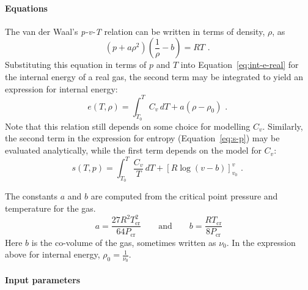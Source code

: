 \paragraph{Equations}
The van der Waal's \textit{p-v-T} relation can be written
in terms of density, $\rho$, as
\begin{equation}
  \left ( p + a\rho^2 \right ) \left ( \frac{1}{\rho} - b \right ) = RT \text{ . }
\end{equation}
Substituting this equation in terms of $p$ and $T$ into Equation~\ref{eq:int-e-real} for the internal energy of a real gas, the second term may be integrated to yield an expression for internal energy:
\begin{equation}
e(T, \rho) = \int_{T_0}^{T} C_v\,dT + a \left( \rho - \rho_0 \right) \text{ . }
\end{equation}
Note that this relation still depends on some choice for modelling $C_v$.
Similarly, the second term in the expression for entropy (Equation~\ref{eq:s-p})
may be evaluated analytically, while the first term depends on the model for $C_v$:
\begin{equation}
s(T,p) = \int_{T_0}^{T} \frac{C_v}{T}\,dT + \left [ R \log \left( v - b \right ) \right ]_{v_0}^{v} \text { . }
\end{equation}


The constants $a$ and $b$ are computed from the critical point pressure and
temperature for the gas.
\begin{equation}
   a = \frac{27 R^2 T^2_{\text{cr}}}{64 P_{\text{cr}}} \qquad \text{and} \qquad
   b = \frac{R T_{\text{cr}}}{8 P_{\text{cr}}}
\end{equation}
Here $b$ is the co-volume of the gas, sometimes written as $\nu_0$.
In the expression above for internal energy, $\rho_0 = \frac{1}{\nu_0}$.

\paragraph{Input parameters}


